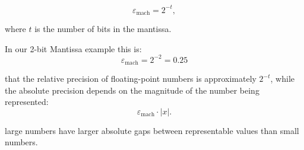 \begin{equation}
    \varepsilon_{\text{mach}} = 2^{-t},
\end{equation}

where $t$ is the number of bits in the mantissa. 


In our 2-bit Mantissa example this is: 
\begin{equation*}
    \varepsilon_{\text{mach}} = 2^{-2} = 0.25
\end{equation*}







 that the relative precision of floating-point numbers is approximately $2^{-t}$, 
while the absolute precision depends on the magnitude of the number being represented:
\begin{equation}
    \varepsilon_{\text{mach}} \cdot |x|.
\end{equation}

 large numbers have larger absolute gaps between representable values than small numbers.

\vspace{3.5em}


